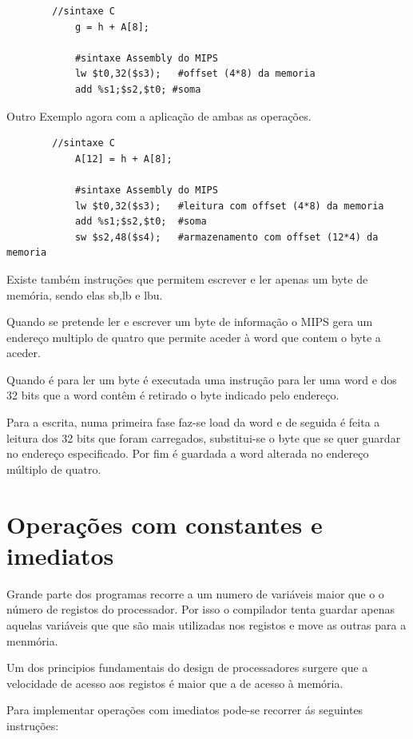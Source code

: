 \documentclass[10pt,a4paper]{book}
\begin{document}
	      \begin{lstlisting}
		//sintaxe C
	        g = h + A[8];

	        #sintaxe Assembly do MIPS
	        lw $t0,32($s3);   #offset (4*8) da memoria
	        add %s1;$s2,$t0; #soma
	      \end{lstlisting}

	      Outro Exemplo agora com a aplicação de ambas as operações.

	     \begin{lstlisting}
		//sintaxe C
	        A[12] = h + A[8];

	        #sintaxe Assembly do MIPS
	        lw $t0,32($s3);   #leitura com offset (4*8) da memoria
	        add %s1;$s2,$t0;  #soma
	        sw $s2,48($s4);	  #armazenamento com offset (12*4) da memoria
	      \end{lstlisting}

			Existe também instruções que permitem escrever e ler apenas um byte de memória, sendo elas sb,lb e lbu.

			Quando se pretende ler e escrever um byte de informação o MIPS gera um endereço multiplo de quatro que permite aceder à word que contem o byte a aceder.

			Quando é para ler um byte é executada uma instrução para ler uma word e dos 32 bits que a word contêm é retirado o byte indicado pelo endereço.

			Para a escrita, numa primeira fase faz-se load da word e de seguida é feita a leitura dos 32 bits que foram carregados, substitui-se o byte que se quer guardar no endereço especificado. Por fim é guardada a word alterada no endereço múltiplo de quatro.

	  \section {Operações com constantes e imediatos}

	      Grande parte dos programas recorre a um numero de variáveis maior que o o número de registos do processador. Por isso o compilador tenta guardar apenas aquelas variáveis que
	      que são mais utilizadas nos registos e move as outras para a menmória.

	      Um dos principios fundamentais do design de processadores surgere que a velocidade de acesso aos registos é maior que a de acesso à memória.

	      Para implementar operações com imediatos pode-se recorrer ás seguintes instruções:
\end{document}
